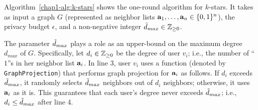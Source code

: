 Algorithm~\ref{chap1-alg:k-stars} shows the one-round algorithm for $k$-stars. 
It takes as input a graph $G$ (represented as neighbor lists $\mathbf{a}_1, \ldots, \mathbf{a}_n \in \{0,1\}^n$), the privacy budget $\epsilon$, and a non-negative integer $\tilde{d}_{max} \in \mathbb{Z}_{\ge0}$. 

The parameter $\tilde{d}_{max}$ plays a role as an upper-bound on the maximum degree $d_{max}$ of $G$. 
Specifically, let $d_i \in \mathbb{Z}_{\ge0}$ be the degree of user $v_i$; i.e., the number of ``$1$''s in her neighbor list $\mathbf{a}_i$. 
In line 3, user $v_i$
uses a function (denoted by \texttt{GraphProjection}) that performs graph projection \cite{Day_SIGMOD16,Kasiviswanathan_TCC13,Raskhodnikova_arXiv15} for $\mathbf{a}_i$ as follows. 
If $d_i$ exceeds $\tilde{d}_{max}$, it randomly 
selects $\tilde{d}_{max}$ neighbors out of $d_i$ neighbors; otherwise, it uses $\mathbf{a}_i$ as it is. 
This guarantees that each user's degree never exceeds $\tilde{d}_{max}$; i.e., $d_i \leq \tilde{d}_{max}$ after line 4. 

